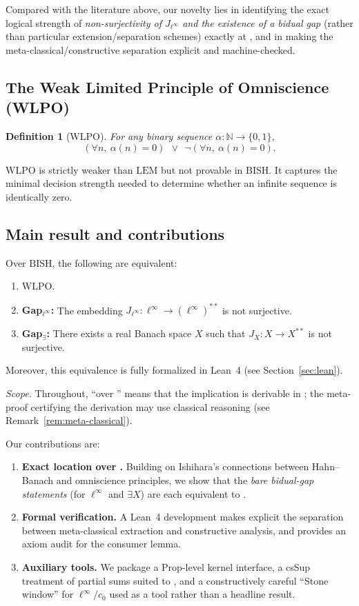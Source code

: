 \documentclass[11pt]{article}
\newtheorem{definition}[theorem]{Definition}
\newenvironment{defi}{\begin{definition}}{\end{definition}}
\newcommand{\N}{\mathbb{N}}
\newcommand{\linf}{\ell^\infty}
\newcommand{\WLPO}{\mathrm{WLPO}}
\newcommand{\BISH}{\mathrm{BISH}}
\newcommand{\LEM}{\mathrm{LEM}}
\begin{document}
Compared with the literature above, our novelty lies in identifying the exact logical strength of \emph{non-surjectivity of $J_{\ell^\infty}$ and the existence of a bidual gap} (rather than particular extension/separation schemes) exactly at \WLPO, and in making the meta-classical/constructive separation explicit and machine-checked.

\subsection{The Weak Limited Principle of Omniscience (WLPO)}

\begin{defi}[$\WLPO$]
For any binary sequence $\alpha:\N\to\{0,1\}$,
\[
(\forall n,\ \alpha(n)=0)\ \ \vee\ \ \neg(\forall n,\ \alpha(n)=0).
\]
\end{defi}

$\WLPO$ is strictly weaker than $\LEM$ but not provable in $\BISH$. It captures the minimal decision strength needed to determine whether an infinite sequence is identically zero.

\subsection{Main result and contributions}

\begin{thm}
Over $\BISH$, the following are equivalent:
\begin{enumerate}
\item $\WLPO$.
\item \textbf{Gap$_{\linf}$:} The embedding $J_{\linf}:\linf\to(\linf)^{**}$ is not surjective.
\item \textbf{Gap$_{\exists}$:} There exists a real Banach space $X$ such that $J_X:X\to X^{**}$ is not surjective.
\end{enumerate}
Moreover, this equivalence is fully formalized in Lean~4 (see Section~\ref{sec:lean}).
\end{thm}

\noindent\emph{Scope.} Throughout, ``over \BISH'' means that the implication is derivable in \BISH; the meta-proof certifying the derivation may use classical reasoning (see Remark~\ref{rem:meta-classical}).

Our contributions are:
\begin{enumerate}[label=\arabic*.]
\item \textbf{Exact location over \BISH.} Building on Ishihara's connections between Hahn--Banach and omniscience principles, we show that the \emph{bare bidual-gap statements} (for $\ell^\infty$ and $\exists X$) are each equivalent to \WLPO.
\item \textbf{Formal verification.} A Lean~4 development makes explicit the separation between meta-classical extraction and constructive analysis, and provides an axiom audit for the consumer lemma.
\item \textbf{Auxiliary tools.} We package a Prop-level kernel interface, a csSup treatment of partial sums suited to \BISH, and a constructively careful ``Stone window'' for $\ell^\infty/c_0$ used as a tool rather than a headline result.
\end{enumerate}
\end{document}
